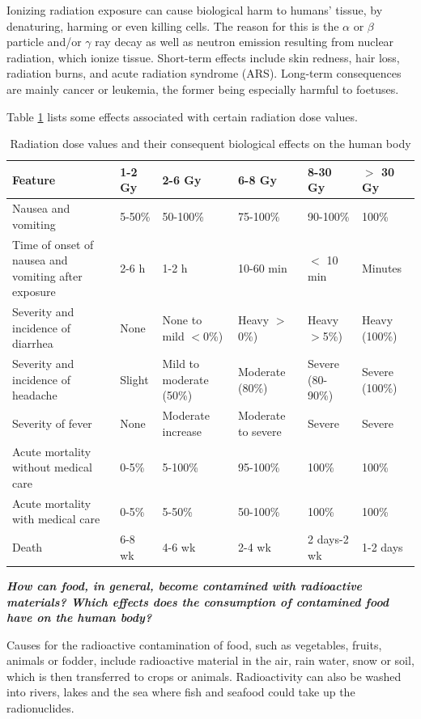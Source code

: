 Ionizing radiation exposure can cause biological harm to humans' tissue, by denaturing, harming or even killing cells. The reason for this is the $\alpha$ or $\beta$ particle and/or $\gamma$ ray decay as well as neutron emission resulting from nuclear radiation, which ionize tissue. Short-term effects include skin redness, hair loss, radiation burns, and acute radiation syndrome (ARS). Long-term consequences are mainly cancer or leukemia, the former being especially harmful to foetuses.

Table \ref{tbl:effects} lists some effects associated with certain radiation dose values.

\begin{table}[h!]
\centering
	\begin{tabular}{|p{3cm}|p{2cm}|p{2cm}|p{2cm}|p{2cm}|p{2cm}|}
		\hline 
		\rowcolor[gray]{0.8}
		Feature & 1-2 Gy & 2-6 Gy & 6-8 Gy & 8-30 Gy & $>$ 30 Gy
		\\ \hline
		Nausea and vomiting & 5-50\% & 50-100\% & 75-100\% & 90-100\% & 100\%
		\\ \hline
		Time of onset of nausea and vomiting after exposure & 2-6 h & 1-2 h & 10-60 min & $<$ 10 min & Minutes
		\\ \hline
		Severity and incidence of diarrhea & None & None to mild $<$0\%) &Heavy $>$0\%) & Heavy $>$5\%) & Heavy (100\%)
		\\ \hline
		Severity and incidence of headache & Slight & Mild to moderate (50\%) &Moderate (80\%) & Severe (80-90\%) & Severe (100\%)
		\\ \hline
		Severity of fever & None & Moderate increase & Moderate to severe & Severe & Severe
		\\ \hline
		Acute mortality without medical care & 0-5\% & 5-100\% & 95-100\% & 100\% & 100\%
		\\ \hline
		Acute mortality with medical care & 0-5\% & 5-50\% & 50-100\% & 100\% &100\%
		\\ \hline
		Death & 6-8 wk & 4-6 wk & 2-4 wk & 2 days-2 wk & 1-2 days
		\\ \hline
	\end{tabular}
\caption{Radiation dose values and their consequent biological effects on the human body}
\label{tbl:effects}
\end{table}

\textbf{\emph{How can food, in general, become contamined with radioactive materials? Which effects does the consumption of contamined food have on the human body?}}

Causes for the radioactive contamination of food, such as vegetables, fruits, animals or fodder, include radioactive material in the air, rain water, snow or soil, which is then transferred to crops or animals. Radioactivity can also be washed into rivers, lakes and the sea where fish and seafood could take up the radionuclides.

